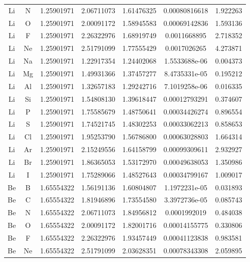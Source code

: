 \begin{longtable}{@{}ccccccc@{}}
Li &  N     &     1.25901971   &   2.06711073  &    1.61476325 &  0.00080816618  &  1.922263\\
Li &  O     &     1.25901971   &   2.00091172  &    1.58945583 &  0.00069142836  &  1.593136\\
Li &  F     &     1.25901971   &   2.26322976  &    1.68919749 &   0.0011668895  &  2.718352\\
Li &  Ne    &     1.25901971   &   2.51791099  &    1.77555429 &   0.0017026265  &  4.273871\\
Li &  Na    &     1.25901971   &   1.22917354  &    1.24402068 &  1.5533688e-06  &  0.004373\\
Li &  Mg    &     1.25901971   &   1.49931366  &    1.37457277 &  8.4735331e-05  &  0.195212\\
Li &  Al    &     1.25901971   &   1.32657183  &    1.29242716 &  7.1019258e-06  &  0.016335\\
Li &  Si    &     1.25901971   &   1.54808130  &    1.39618447 &  0.00012793291  &  0.374607\\
Li &  P     &     1.25901971   &   1.75585679  &    1.48750641 &  0.00034426274  &  0.896554\\
Li &  S     &     1.25901971   &   1.74521745  &    1.48302253 &  0.00033062213  &  0.858653\\
Li &  Cl    &     1.25901971   &   1.95253790  &    1.56786800 &  0.00063028803  &  1.664314\\
Li &  Ar    &     1.25901971   &   2.15249556  &    1.64158799 &  0.00099309611  &  2.932927\\
Li &  Br    &     1.25901971   &   1.86365053  &    1.53172970 &  0.00049638053  &  1.350986\\
Li &  I     &     1.25901971   &   1.75289066  &    1.48527643 &  0.00034799167  &  1.009017\\
Be &  B     &     1.65554322   &   1.56191136  &    1.60804807 &  1.1972231e-05  &  0.031893\\
Be &  C     &     1.65554322   &   1.81946896  &    1.73554580 &  3.3972736e-05  &  0.085743\\
Be &  N     &     1.65554322   &   2.06711073  &    1.84956812 &   0.0001992019  &  0.484038\\
Be &  O     &     1.65554322   &   2.00091172  &    1.82001716 &  0.00014155775  &  0.330806\\
Be &  F     &     1.65554322   &   2.26322976  &    1.93457449 &  0.00041123838  &  0.983581\\
Be &  Ne    &     1.65554322   &   2.51791099  &    2.03628351 &  0.00078343308  &  2.059895\\

\end{longtable}

